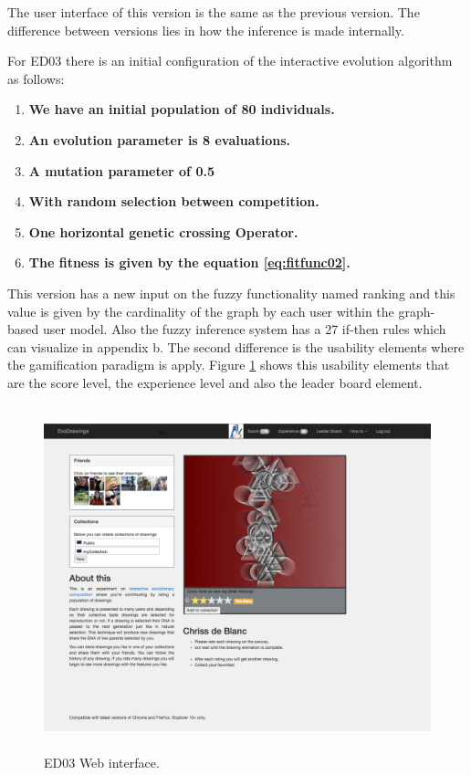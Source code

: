 The user interface of this version is the same as the previous version. The
difference between versions lies in how the inference is made internally.

For ED03 there is an initial configuration of the interactive evolution
algorithm as follows:
\begin{enumerate}
	\item  \textbf{We have an initial population of 80 individuals.}

	\item  \textbf{An evolution parameter is 8 evaluations.}

	\item  \textbf{A mutation parameter of 0.5}
	\item  \textbf{With random selection between competition.}
	\item  \textbf{One horizontal genetic crossing Operator.}
	\item  \textbf{The fitness is given by the equation \ref{eq:fitfunc02}.}
\end{enumerate}

This version has a new input on the fuzzy functionality named ranking and this
value is given by the cardinality of the graph by each user within the graph-
based user model. Also the fuzzy inference system has a 27 if-then rules which
can visualize in appendix b. The second difference is the usability elements
where the gamification paradigm is apply. Figure \ref{fig:intarface03} shows this
usability elements that are the score level, the experience level and also the
leader board element.

\begin{figure}
\captionsetup{justification=centering,margin=2cm}
\centering
\setlength\fboxsep{0pt}
\setlength\fboxrule{0.7pt}
\includegraphics[width=12cm,height=10cm,keepaspectratio]{img/interface.png}
\caption{ED03 Web interface.}
\label{fig:intarface03}
\end{figure}

